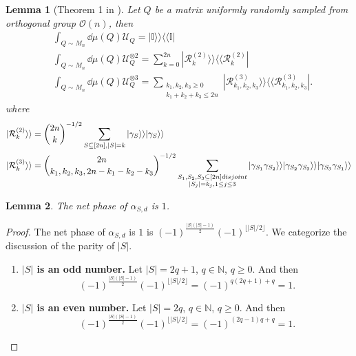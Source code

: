 \documentclass{article}
\newtheorem{lemma}{Lemma}
\newcommand{\supket}[1]{|#1 \rangle\rangle}
\newcommand{\supbra}[1]{\langle\langle #1 |}
\newcommand{\floor}[1]{\lfloor #1 \rfloor}
\begin{document}
\begin{lemma}[Theorem 1 in \cite{wan2022matchgate}]
    Let $Q$ be a matrix uniformly randomly sampled from orthogonal group $\mathcal{O}(n)$, then
\begin{align}
& \int_{Q\sim M_n} \dd\mu(Q) \mathcal{U}_Q = \supket{\mathbb{I}}\supbra{\mathbb{I}}\\
& \int_{Q\sim M_n} \dd\mu(Q)\mathcal{U}_Q^{\otimes 2} = \sum_{k=0}^{2n}\supket{\mathcal{R}_k^{(2)}}\supbra{\mathcal{R}_k^{(2)}}\\
& \int_{Q\sim M_n} \dd\mu(Q)\mathcal{U}_Q^{\otimes 3} = \sum_{
\substack{
k_1,k_2,k_3\geq 0\\
k_1 + k_2 + k_3\leq 2n
}
}\supket{\mathcal{R}_{k_1,k_2,k_3}^{(3)}}\supbra{\mathcal{R}_{k_1,k_2,k_3}^{(3)}}.
\end{align}
where
\begin{align}
    &\supket{\mathcal{R}_k^{(2)}} = { 2n\choose k}^{-1/2} \sum_{S\subseteq [2n],|S|=k}\supket{\gamma_S}\supket{\gamma_S}\\
    &\supket{\mathcal{R}_k^{(3)}} = {2n \choose k_1,k_2,k_3,2n-k_1-k_2-k_3}^{-1/2} \sum_{
    \substack{
 S_1, S_2, S_3\subseteq [2n] disjoint\\
 \abs{S_j}=k_j,1\leq j\leq 3
    }
    } \supket{\gamma_{S_1}\gamma_{S_2}}
    \supket{\gamma_{S_2}\gamma_{S_3}}
    \supket{\gamma_{S_3}\gamma_{S_1}}
\label{eq:third_moment}
\end{align}
\label{lem:threemomentsMatchgate}
\end{lemma}

\begin{lemma}
\label{lemma: The net phase of alpha is 1}
    The net phase of $\alpha_{S,d}$ is $1$.
\end{lemma}
\begin{proof}
    The net phase of $\alpha_{S,d}$ is $1$ is $(-1)^{\frac{|S|(|S|-1)}{2}} (-1)^{\floor{|S|/2}}$. We categorize the discussion of the parity of $|S|$.
    \begin{enumerate}
        \item \textbf{$|S|$ is an odd number.} Let $|S| = 2q+1$, $ q\in \mathbb{N}$, $q\geq 0$. And then
        \begin{equation}
            (-1)^{\frac{|S|(|S|-1)}{2}} (-1)^{\floor{|S|/2}} = (-1)^{q(2q+1)+q} = 1.
        \end{equation}
        \item \textbf{$|S|$ is an even number.} Let $|S| = 2q$, $ q\in \mathbb{N}$, $q\geq 0$. And then
        \begin{equation}
            (-1)^{\frac{|S|(|S|-1)}{2}} (-1)^{\floor{|S|/2}} = (-1)^{(2q-1)q+q} = 1.
        \end{equation}
    \end{enumerate}
\end{proof}
\end{document}
